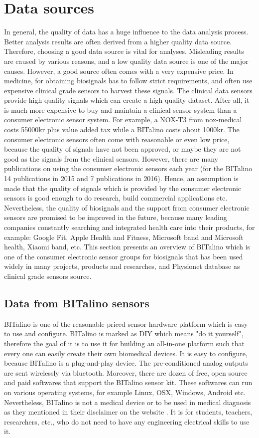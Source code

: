 \section{Data sources}
In general, the quality of data has a huge influence to the data analysis process. Better analysis results are often derived from a higher quality data source. Therefore, choosing a good data source is vital for analyses. Misleading results are caused by various reasons, and a low quality data source is one of the major causes. However, a good source often comes with a very expensive price. In medicine, for obtaining biosignals has to follow strict requirements, and often use expensive clinical grade sensors to harvest these signals. The clinical data sensors provide high quality signals which can create a high quality dataset. After all, it is much more expensive to buy and maintain a clinical sensor system than a consumer electronic sensor system. For example, a NOX-T3 from nox-medical costs 55000kr plus value added tax\citep{Thomas} while a BITalino costs about 1000kr. The consumer electronic sensors often come with reasonable or even low price, because the quality of signals have not been approved, or maybe they are not good as the signals from the clinical sensors. However, there are many publications on using the consumer electronic sensors each year (for the BITalino 14 publications in 2015 and 7 publications in 2016\citep{BITalinoPubs}). Hence, an assumption is made that the quality of signals which is provided by the consumer electronic sensors is good enough to do research, build commercial applications etc. Nevertheless, the quality of biosignals and the support from consumer electronic sensors are promised to be improved in the future, because many leading companies constantly searching and integrated health care into their products, for example: Google Fit, Apple Health and Fitness, Microsoft band and Microsoft health, Xiaomi band, etc. This section presents an overview of BITalino which is one of the consumer electronic sensor groups for biosignals that has been used widely in many projects, products and researches, and Physionet database as clinical grade sensors source.
    \subsection{Data from BITalino sensors}
        BITalino is one of the reasonable priced sensor hardware platform which is easy to use and configure. BITalino is marked as DIY which means "do it yourself", therefore the goal of it is to use it for building an all-in-one platform such that every one can easily create their own biomedical devices. It is easy to configure, because BITalino is a plug-and-play device. The pre-conditioned analog outputs are sent wirelessly via bluetooth. Moreover, there are dozen of free, open source and paid softwares that support the BITalino sensor kit. These softwares can run on various operating systems, for example Linux, OSX, Windows, Android etc. Nevertheless, BITalino is not a medical device or to be used in medical diagnosis as they mentioned in their disclaimer on the website \citep{BITalino}. It is for students, teachers, researchers, etc., who do not need to have any engineering electrical skills to use it.
